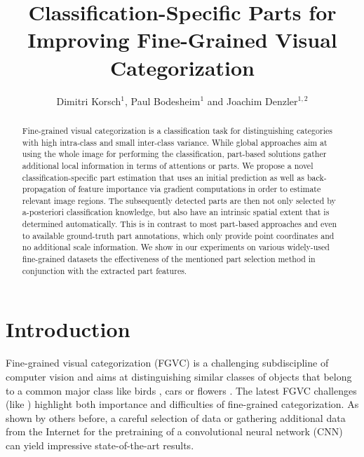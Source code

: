 \documentclass[runningheads]{llncs}
\begin{document}
	\pagestyle{headings}
	\mainmatter

	\title{Classification-Specific Parts for Improving Fine-Grained Visual Categorization}

	\author{
		Dimitri Korsch$^1$,
		Paul Bodesheim$^1$ and
		Joachim Denzler$^{1,2}$
	}

	\maketitle
	\vspace{-.1cm}
	\begin{abstract}
Fine-grained visual categorization is a classification task for distinguishing categories with high intra-class and small inter-class variance.
While global approaches aim at using the whole image for performing the classification, part-based solutions gather additional local information in terms of attentions or parts.
We propose a novel classification-specific part estimation that uses an initial prediction as well as back-propagation of feature importance via gradient computations in order to estimate relevant image regions.
The subsequently detected parts are then not only selected by a-posteriori classification knowledge, but also have an intrinsic spatial extent that is determined automatically.
This is in contrast to most part-based approaches and even to available ground-truth part annotations, which only provide point coordinates and no additional scale information.
We show in our experiments on various widely-used fine-grained datasets the effectiveness of the mentioned part selection method in conjunction with the extracted part features.
\end{abstract}
 	\section{Introduction}
\label{sec:introduction}

Fine-grained visual categorization (FGVC) is a challenging subdiscipline of computer vision and aims at distinguishing similar classes of objects that belong to a common major class like birds \cite{NABirds,CUB_200_2011}, cars \cite{StanfordCars} or flowers \cite{Flowers102}.
The latest FGVC challenges (like \cite{iNaturalist}) highlight both importance and difficulties of fine-grained categorization.
As shown by others before, a careful selection of data \cite{Cui_2018_CVPR_large} or gathering additional data from the Internet \cite{krause2016unreasonable} for the pretraining of a convolutional neural network (CNN) can yield impressive state-of-the-art results.
\end{document}
